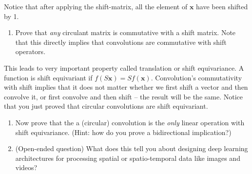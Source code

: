 Notice that after applying the shift-matrix, all the element of $\mathbf{x}$ have been shifted by 1.

\begin{enumerate}
\item Prove that \emph{any} circulant matrix is commutative with a shift matrix. 
Note that this directly implies that convolutions are commutative with shift operators. 
\end{enumerate}

This leads to very important property called translation or shift equivariance. A function is shift equivariant if $f(S\mathbf{x})=Sf(\mathbf{x}).$ Convolution's commutativity with shift implies that it does not matter whether we first shift a vector and then convolve it, or first convolve and then shift -- the result will be the same. 
Notice that you just proved that circular convolutions are shift equivariant. 

\begin{enumerate}[resume]
\item Now prove that the a (circular) convolution is the \emph{only} linear operation with shift equivariance. (Hint: how do you prove a bidirectional implication?)

\item (Open-ended question) What does this tell you about designing deep learning architectures for processing 
spatial or spatio-temporal data like images and videos? 
\end{enumerate}